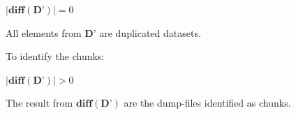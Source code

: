 $|\textbf{diff}(\mathbf{D’})| = 0$

All elements from $\mathbf{D’}$ are duplicated datasets.


To identify the chunks:

$|\textbf{diff}(\mathbf{D’})| > 0$


The result from $\textbf{diff}(\mathbf{D’})$ are the dump-files identified as chunks.







